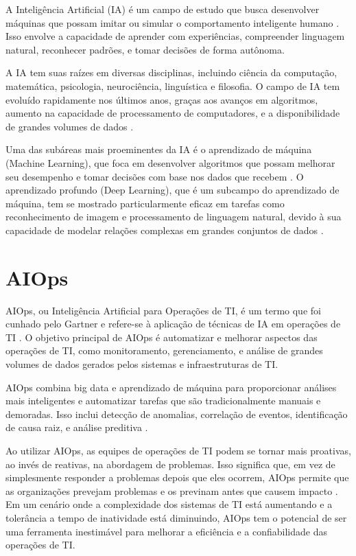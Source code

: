A Inteligência Artificial (IA) é um campo de estudo que busca desenvolver máquinas que possam imitar ou simular o comportamento inteligente humano \cite{russell2016artificial}. Isso envolve a capacidade de aprender com experiências, compreender linguagem natural, reconhecer padrões, e tomar decisões de forma autônoma. 

A IA tem suas raízes em diversas disciplinas, incluindo ciência da computação, matemática, psicologia, neurociência, linguística e filosofia. O campo de IA tem evoluído rapidamente nos últimos anos, graças aos avanços em algoritmos, aumento na capacidade de processamento de computadores, e a disponibilidade de grandes volumes de dados \cite{poole2017artificial}.

Uma das subáreas mais proeminentes da IA é o aprendizado de máquina (Machine Learning), que foca em desenvolver algoritmos que possam melhorar seu desempenho e tomar decisões com base nos dados que recebem \cite{mitchell1997machine}. O aprendizado profundo (Deep Learning), que é um subcampo do aprendizado de máquina, tem se mostrado particularmente eficaz em tarefas como reconhecimento de imagem e processamento de linguagem natural, devido à sua capacidade de modelar relações complexas em grandes conjuntos de dados \cite{lecun2015deep}.

\section{AIOps}

AIOps, ou Inteligência Artificial para Operações de TI, é um termo que foi cunhado pelo Gartner e refere-se à aplicação de técnicas de IA em operações de TI \cite{gardner2017artificial}. O objetivo principal de AIOps é automatizar e melhorar aspectos das operações de TI, como monitoramento, gerenciamento, e análise de grandes volumes de dados gerados pelos sistemas e infraestruturas de TI.

AIOps combina big data e aprendizado de máquina para proporcionar análises mais inteligentes e automatizar tarefas que são tradicionalmente manuais e demoradas. Isso inclui detecção de anomalias, correlação de eventos, identificação de causa raiz, e análise preditiva \cite{padhy2018survey}. 

Ao utilizar AIOps, as equipes de operações de TI podem se tornar mais proativas, ao invés de reativas, na abordagem de problemas. Isso significa que, em vez de simplesmente responder a problemas depois que eles ocorrem, AIOps permite que as organizações prevejam problemas e os previnam antes que causem impacto \cite{sill2019aiops}. Em um cenário onde a complexidade dos sistemas de TI está aumentando e a tolerância a tempo de inatividade está diminuindo, AIOps tem o potencial de ser uma ferramenta inestimável para melhorar a eficiência e a confiabilidade das operações de TI.


